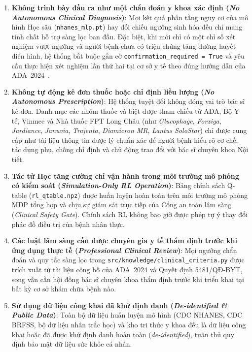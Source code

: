 \begin{enumerate}
  \item \textbf{Không trình bày đầu ra như một chẩn đoán y khoa xác định (\emph{No Autonomous Clinical Diagnosis})}:
  Mọi kết quả phân tầng nguy cơ của mô hình Học sâu (\texttt{nhanes\_mlp.pt}) hay đối chiếu ngưỡng sinh hóa đều chỉ mang tính chất hỗ trợ sàng lọc ban đầu. Đặc biệt, khi mới chỉ có một chỉ số xét nghiệm vượt ngưỡng và người bệnh chưa có triệu chứng tăng đường huyết điển hình, hệ thống bắt buộc gắn cờ \texttt{confirmation\_required = True} và yêu cầu thực hiện xét nghiệm lần thứ hai tại cơ sở y tế theo đúng hướng dẫn của ADA~2024~\cite{ada2024}.

  \item \textbf{Không tự động kê đơn thuốc hoặc chỉ định liều lượng (\emph{No Autonomous Prescription})}:
  Hệ thống tuyệt đối không đóng vai trò bác sĩ kê đơn. Danh mục các nhóm thuốc và biệt dược tham chiếu từ ADA, Bộ Y tế, Vinmec và Nhà thuốc FPT Long Châu (như \emph{Glucophage}, \emph{Forxiga}, \emph{Jardiance}, \emph{Januvia}, \emph{Trajenta}, \emph{Diamicron MR}, \emph{Lantus SoloStar}) chỉ được cung cấp như tài liệu thông tin dược lý chuẩn xác để người bệnh hiểu rõ cơ chế, tác dụng phụ, chống chỉ định và chủ động trao đổi với bác sĩ chuyên khoa Nội tiết.

  \item \textbf{Tác tử Học tăng cường chỉ vận hành trong môi trường mô phỏng có kiểm soát (\emph{Simulation-Only RL Operation})}:
  Bảng chính sách Q-table (\texttt{rl\_qtable.npz}) được huấn luyện hoàn toàn trên môi trường mô phỏng MDP tổng hợp và chịu sự giám sát trực tiếp của Cổng an toàn lâm sàng (\emph{Clinical Safety Gate}). Chính sách RL không bao giờ được phép tự ý thay đổi phác đồ điều trị của bệnh nhân thực.

  \item \textbf{Các luật lâm sàng cần được chuyên gia y tế thẩm định trước khi ứng dụng thực tế (\emph{Professional Clinical Review})}:
  Mọi ngưỡng chẩn đoán và quy tắc sàng lọc trong \texttt{src/knowledge/clinical\_criteria.py} được trích xuất từ tài liệu công bố của ADA~2024 và Quyết định 5481/QĐ-BYT, song vẫn cần hội đồng bác sĩ chuyên khoa thẩm định trước khi triển khai tại bất kỳ cơ sở khám chữa bệnh nào.

  \item \textbf{Sử dụng dữ liệu công khai đã khử định danh (\emph{De-identified \& Public Data})}:
  Toàn bộ dữ liệu huấn luyện mô hình (CDC NHANES, CDC BRFSS, bộ dữ liệu nhân trắc học) và kho tri thức y khoa đều là dữ liệu công khai hoặc đã được khử định danh hoàn toàn (\emph{de-identified}), tuân thủ quy định bảo mật dữ liệu sức khỏe cá nhân.


\end{enumerate}
